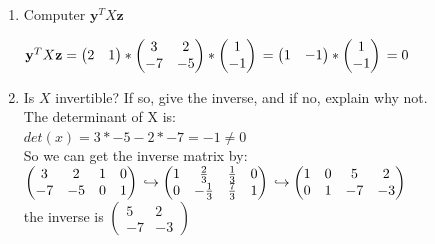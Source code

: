 \documentclass[a4paper]{article}
\theoremstyle{definition}
\newenvironment{soln}{
	\leavevmode\color{blue}\ignorespaces
}{}
\begin{document}
	\begin{enumerate}
		\item 	Computer $\mathbf{y}^{T} X \mathbf{z}$\\
			    \begin{soln}
					 $\mathbf{y}^{T} X \mathbf{z} \\
					 =\begin{pmatrix}
						 2 & 1 
					 \end{pmatrix} * 
					 \begin{pmatrix}
						 3 &2 \\ -7 &-5 \\
					 \end{pmatrix} * 
					 \begin{pmatrix}
						 1 \\ -1
					 \end{pmatrix} \\
					 = \begin{pmatrix}
						 1 & -1
					 \end{pmatrix} *
					 \begin{pmatrix}
						 1 \\ -1
					 \end{pmatrix} \\
					 = 0$   
				\end{soln}
		\item 	Is $X$ invertible? If so, give the inverse, and if no, explain why not.\\
		        \begin{soln}  The determinant of X is: \\
					$det(x) = 3*-5 - 2*-7 = -1 \neq 0$ \\
					So we can get the inverse matrix by: \\
					$\begin{pmatrix}
						3 &2 &1 &0 \\ -7 &-5 &0 &1 \\
					\end{pmatrix} \\
					\hookrightarrow \begin{pmatrix}
						1 &\frac{2}{3} &\frac{1}{3} &0 \\ 0 &-\frac{1}{3} &\frac{7}{3} &1 \\
					\end{pmatrix} \\
					\hookrightarrow \begin{pmatrix}
						1 &0 &5 &2 \\ 0 &1 &-7 &-3 \\
					\end{pmatrix}$ \\

					the inverse is $\begin{pmatrix}
						5 &2 \\ -7 &-3
					\end{pmatrix}$
				\end{soln}
	\end{enumerate}
	
\end{document}
